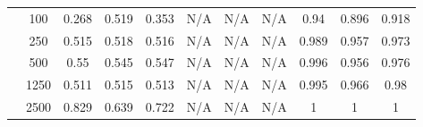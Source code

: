 \begin{table*}[]
{\begin{tabular}{ccccccccccc}
			\multicolumn{1}{|c|}{}                                            & \multicolumn{1}{c|}{100}           & \multicolumn{1}{c|}{0.268}                   & \multicolumn{1}{c|}{0.519}                & \multicolumn{1}{c|}{0.353}            & \multicolumn{1}{c|}{N/A}                      & \multicolumn{1}{c|}{N/A}                   & \multicolumn{1}{c|}{N/A}               & \multicolumn{1}{c|}{0.94}                   & \multicolumn{1}{c|}{0.896}               & \multicolumn{1}{c|}{0.918}           \\ \cline{2-11}
			\multicolumn{1}{|c|}{}                                            & \multicolumn{1}{c|}{250}           & \multicolumn{1}{c|}{0.515}                   & \multicolumn{1}{c|}{0.518}                & \multicolumn{1}{c|}{0.516}            & \multicolumn{1}{c|}{N/A}                      & \multicolumn{1}{c|}{N/A}                   & \multicolumn{1}{c|}{N/A}               & \multicolumn{1}{c|}{0.989}                  & \multicolumn{1}{c|}{0.957}               & \multicolumn{1}{c|}{0.973}           \\ \cline{2-11}
			\multicolumn{1}{|c|}{}                                            & \multicolumn{1}{c|}{500}           & \multicolumn{1}{c|}{0.55}                    & \multicolumn{1}{c|}{0.545}                & \multicolumn{1}{c|}{0.547}            & \multicolumn{1}{c|}{N/A}                      & \multicolumn{1}{c|}{N/A}                   & \multicolumn{1}{c|}{N/A}               & \multicolumn{1}{c|}{0.996}                  & \multicolumn{1}{c|}{0.956}               & \multicolumn{1}{c|}{0.976}           \\ \cline{2-11}
			\multicolumn{1}{|c|}{}                                            & \multicolumn{1}{c|}{1250}          & \multicolumn{1}{c|}{0.511}                   & \multicolumn{1}{c|}{0.515}                & \multicolumn{1}{c|}{0.513}            & \multicolumn{1}{c|}{N/A}                      & \multicolumn{1}{c|}{N/A}                   & \multicolumn{1}{c|}{N/A}               & \multicolumn{1}{c|}{0.995}                  & \multicolumn{1}{c|}{0.966}               & \multicolumn{1}{c|}{0.98}            \\ \cline{2-11}
			\multicolumn{1}{|c|}{}                                            & \multicolumn{1}{c|}{2500}          & \multicolumn{1}{c|}{0.829}                   & \multicolumn{1}{c|}{0.639}                & \multicolumn{1}{c|}{0.722}            & \multicolumn{1}{c|}{N/A}                      & \multicolumn{1}{c|}{N/A}                   & \multicolumn{1}{c|}{N/A}               & \multicolumn{1}{c|}{1}                      & \multicolumn{1}{c|}{1}                   & \multicolumn{1}{c|}{1}               \\ \hline

\end{tabular}}
\end{table*}

